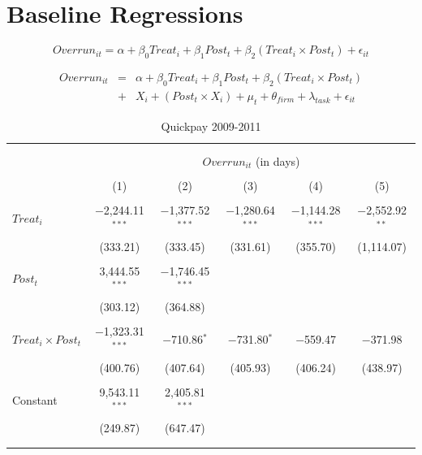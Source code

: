 \documentclass[
]{article}
\begin{document}
\hypertarget{baseline-regressions}{%
\section{Baseline Regressions}\label{baseline-regressions}}

\[ Overrun_{it} = \alpha+\beta_0 Treat_i + \beta_1 Post_t + \beta_2 (Treat_i \times Post_t) + \epsilon_{it}\]

\[ \begin{aligned} Overrun_{it} &=& \alpha+\beta_0 Treat_i + \beta_1 Post_t + \beta_2 (Treat_i \times Post_t)\\
&+&  X_i + (Post_t \times X_i) + \mu_t + \theta_{firm} + \lambda_{task}+ \epsilon_{it}
\end{aligned}\]

\begin{table}[H] \centering 
  \caption{Quickpay 2009-2011} 
  \label{} 
\small 
\begin{tabular}{@{\extracolsep{-2pt}}lccccc} 
\\[-1.8ex]\hline 
\hline \\[-1.8ex] 
\\[-1.8ex] & \multicolumn{5}{c}{$Overrun_{it}$ (in days)} \\ 
\\[-1.8ex] & (1) & (2) & (3) & (4) & (5)\\ 
\hline \\[-1.8ex] 
 $Treat_i$ & $-$2,244.11$^{***}$ & $-$1,377.52$^{***}$ & $-$1,280.64$^{***}$ & $-$1,144.28$^{***}$ & $-$2,552.92$^{**}$ \\ 
  & (333.21) & (333.45) & (331.61) & (355.70) & (1,114.07) \\ 
  & & & & & \\ 
 $Post_t$ & 3,444.55$^{***}$ & $-$1,746.45$^{***}$ &  &  &  \\ 
  & (303.12) & (364.88) &  &  &  \\ 
  & & & & & \\ 
 $Treat_i \times Post_t$ & $-$1,323.31$^{***}$ & $-$710.86$^{*}$ & $-$731.80$^{*}$ & $-$559.47 & $-$371.98 \\ 
  & (400.76) & (407.64) & (405.93) & (406.24) & (438.97) \\ 
  & & & & & \\ 
 Constant & 9,543.11$^{***}$ & 2,405.81$^{***}$ &  &  &  \\ 
  & (249.87) & (647.47) &  &  &  \\ 
  & & & & & \\ 
\hline \\[-1.8ex] 

\end{tabular}
\end{table}
\end{document}
